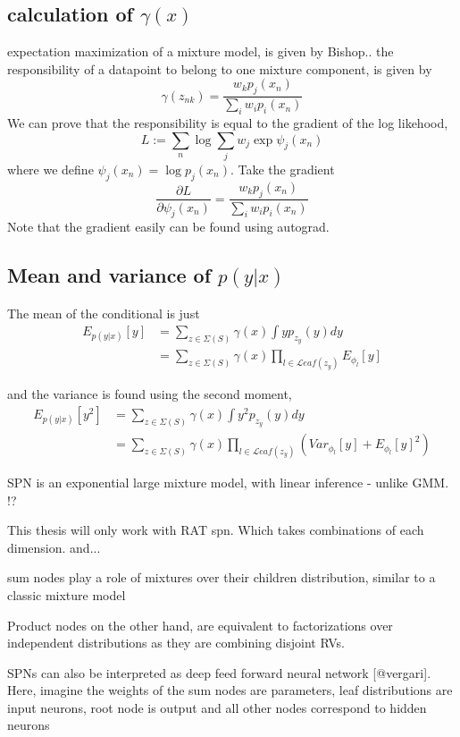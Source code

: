 \subsection*{calculation of $\gamma(x)$}
expectation maximization of a mixture model, is given by Bishop..
the responsibility of a datapoint to belong to one mixture component, is given by
$$\gamma(z_{nk}) = \frac{w_k p_j(x_n)}{\sum_i w_i p_i(x_n)}$$
We can prove that the responsibility is equal to the gradient of the log likehood, 
$$L:= \sum_n \log \sum_j w_j \exp \psi_j(x_n)$$
where we define $\psi_j(x_n) = \log p_j(x_n)$. Take the gradient 
$$\frac{\partial L}{\partial \psi_{j}(x_{n})} = \frac{w_k p_j(x_n)}{\sum_i w_i p_i(x_n)}$$
Note that the gradient easily can be found using autograd. 


\subsection*{Mean and variance of $p(y|x)$}

The mean of the conditional is just
\begin{align*}
    E_{p(y|x)}[y] &= \sum_{z \in \Sigma(S)} \gamma(x) \int  y p_{z_y}(y) dy \\
    &= \sum_{z \in \Sigma(S)} \gamma(x) \prod_{l \in \mathcal{L}eaf(z_y)} E_{\phi_l}[y]
\end{align*}

and the variance is found using the second moment, 
\begin{align*}
    E_{p(y|x)}[y^2] &= \sum_{z \in \Sigma(S)} \gamma(x) \int  y^2 p_{z_y}(y) dy \\
    &= \sum_{z \in \Sigma(S)} \gamma(x) \prod_{l \in \mathcal{L}eaf(z_y)} (Var_{\phi_l}[y]+E_{\phi_l}[y]^2)
\end{align*}



SPN is an exponential large mixture model, with linear inference - unlike GMM. !?


This thesis will only work with RAT spn. Which takes combinations of each dimension. and...



sum nodes play a role of
mixtures over their children distribution, similar to a classic mixture model

Product
nodes on the other hand, are equivalent to factorizations over independent distributions as they are
combining disjoint RVs.

SPNs can also be interpreted as deep feed forward neural network [@vergari]. Here, imagine the
weights of the sum nodes are parameters, leaf distributions are input neurons, root node is output and
all other nodes correspond to hidden neurons



